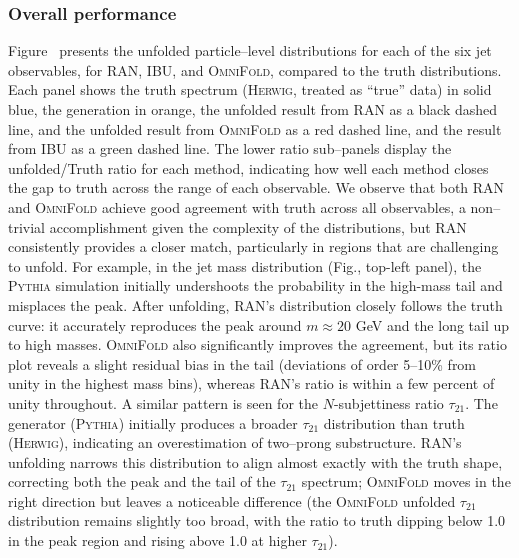 {{        \subsubsection{Overall performance}
            Figure~ presents the unfolded particle--level distributions for each of the six jet observables, for RAN, IBU, and \textsc{OmniFold}, compared to the truth distributions.
            Each panel shows the truth spectrum (\textsc{Herwig}, treated as “true” data) in solid blue, the generation in orange, the unfolded result from RAN as a black dashed line, and the unfolded result from \textsc{OmniFold} as a red dashed line, and the result from IBU as a green dashed line.
            The lower ratio sub--panels display the unfolded/Truth ratio for each method, indicating how well each method closes the gap to truth across the range of each observable.
            We observe that both RAN and \textsc{OmniFold} achieve good agreement with truth across all observables, a non--trivial accomplishment given the complexity of the distributions, but RAN consistently provides a closer match, particularly in regions that are challenging to unfold.
            For example, in the jet mass distribution (Fig., top-left panel), the \textsc{Pythia} simulation initially undershoots the probability in the high-mass tail and misplaces the peak.
            After unfolding, RAN’s distribution closely follows the truth curve: it accurately reproduces the peak around $m\approx 20$ GeV and the long tail up to high masses. \textsc{OmniFold} also significantly improves the agreement, but its ratio plot reveals a slight residual bias in the tail (deviations of order 5–10\% from unity in the highest mass bins), whereas RAN’s ratio is within a few percent of unity throughout.
            A similar pattern is seen for the $N$-subjettiness ratio $\tau_{21}$.
            The generator (\textsc{Pythia}) initially produces a broader $\tau_{21}$ distribution than truth (\textsc{Herwig}), indicating an overestimation of two--prong substructure.
            RAN’s unfolding narrows this distribution to align almost exactly with the truth shape, correcting both the peak and the tail of the $\tau_{21}$ spectrum; \textsc{OmniFold} moves in the right direction but leaves a noticeable difference (the \textsc{OmniFold} unfolded $\tau_{21}$ distribution remains slightly too broad, with the ratio to truth dipping below 1.0 in the peak region and rising above 1.0 at higher $\tau_{21}$).
}}
